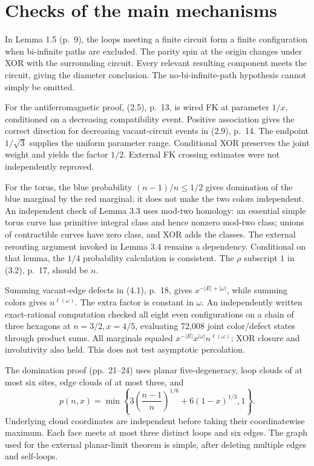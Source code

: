 \documentclass[10pt]{article}
\begin{document}
\section*{Checks of the main mechanisms}
In Lemma 1.5 (p. 9), the loops meeting a finite circuit form a finite configuration when bi-infinite paths are excluded. The parity spin at the origin changes under XOR with the surrounding circuit. Every relevant resulting component meets the circuit, giving the diameter conclusion. The no-bi-infinite-path hypothesis cannot simply be omitted.\par
For the antiferromagnetic proof, (2.5), p. 13, is wired FK at parameter \(1/x\), conditioned on a decreasing compatibility event. Positive association gives the correct direction for decreasing vacant-circuit events in (2.9), p. 14. The endpoint \(1/\sqrt3\) supplies the uniform parameter range. Conditional XOR preserves the joint weight and yields the factor \(1/2\). External FK crossing estimates were not independently reproved.\par
For the torus, the blue probability \((n-1)/n\le1/2\) gives domination of the blue marginal by the red marginal; it does not make the two colors independent. An independent check of Lemma 3.3 uses mod-two homology: an essential simple torus curve has primitive integral class and hence nonzero mod-two class; unions of contractible curves have zero class, and XOR adds the classes. The external rerouting argument invoked in Lemma 3.4 remains a dependency. Conditional on that lemma, the \(1/4\) probability calculation is consistent. The \(\rho\) subscript \(1\) in (3.2), p. 17, should be \(n\).\par
Summing vacant-edge defects in (4.1), p. 18, gives \(x^{-|E|+|\omega|}\), while summing colors gives \(n^{\ell(\omega)}\). The extra factor is constant in \(\omega\). An independently written exact-rational computation checked all eight even configurations on a chain of three hexagons at \(n=3/2,x=4/5\), evaluating 72,008 joint color/defect states through product sums. All marginals equaled \(x^{-|E|}x^{|\omega|}n^{\ell(\omega)}\); XOR closure and involutivity also held. This does not test asymptotic percolation.\par
The domination proof (pp. 21–24) uses planar five-degeneracy, loop clouds of at most six sites, edge clouds of at most three, and \[p(n,x)=\min\!\left\{3\left(\frac{n-1}{n}\right)^{1/6}+6(1-x)^{1/3},1\right\}.\] Underlying cloud coordinates are independent before taking their coordinatewise maximum. Each face meets at most three distinct loops and six edges. The graph used for the external planar-limit theorem is simple, after deleting multiple edges and self-loops.\par
\end{document}
